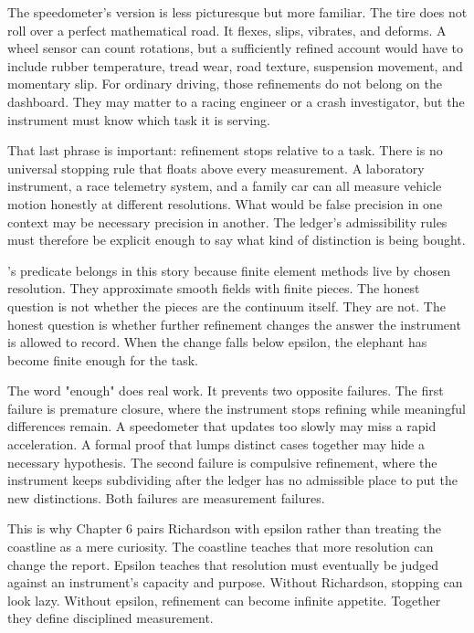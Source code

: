 The speedometer's version is less picturesque but more familiar. The tire does
not roll over a perfect mathematical road. It flexes, slips, vibrates, and
deforms. A wheel sensor can count rotations, but a sufficiently refined account
would have to include rubber temperature, tread wear, road texture, suspension
movement, and momentary slip. For ordinary driving, those refinements do not
belong on the dashboard. They may matter to a racing engineer or a crash
investigator, but the instrument must know which task it is serving.

That last phrase is important: refinement stops relative to a task. There is no
universal stopping rule that floats above every measurement. A laboratory
instrument, a race telemetry system, and a family car can all measure vehicle
motion honestly at different resolutions. What would be false precision in one
context may be necessary precision in another. The ledger's admissibility rules
must therefore be explicit enough to say what kind of distinction is being
bought.

's  predicate belongs in this story
because finite element methods live by chosen resolution. They approximate
smooth fields with finite pieces. The honest question is not whether the pieces
are the continuum itself. They are not. The honest question is whether further
refinement changes the answer the instrument is allowed to record. When the
change falls below epsilon, the elephant has become finite enough for the task.

The word "enough" does real work. It prevents two opposite failures. The first
failure is premature closure, where the instrument stops refining while
meaningful differences remain. A speedometer that updates too slowly may miss a
rapid acceleration. A formal proof that lumps distinct cases together may hide
a necessary hypothesis. The second failure is compulsive refinement, where the
instrument keeps subdividing after the ledger has no admissible place to put
the new distinctions. Both failures are measurement failures.

This is why Chapter 6 pairs Richardson with epsilon rather than treating the
coastline as a mere curiosity. The coastline teaches that more resolution can
change the report. Epsilon teaches that resolution must eventually be judged
against an instrument's capacity and purpose. Without Richardson, stopping can
look lazy. Without epsilon, refinement can become infinite appetite. Together
they define disciplined measurement.

